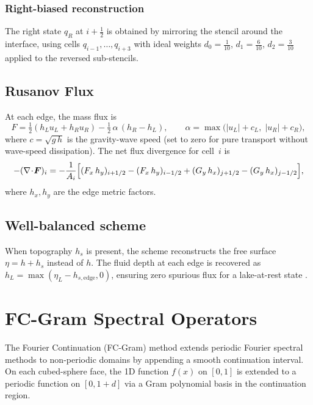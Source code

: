 \documentclass[11pt,a4paper]{article}
\newcommand{\half}{\tfrac{1}{2}}
\begin{document}
\subsubsection{Right-biased reconstruction}
The right state $q_R$ at $i\!+\!\half$ is obtained by mirroring the stencil around the interface, using cells $q_{i-1},\ldots,q_{i+3}$ with ideal weights $d_0=\tfrac{1}{10}$, $d_1=\tfrac{6}{10}$, $d_2=\tfrac{3}{10}$ applied to the reversed sub-stencils.

\subsection{Rusanov Flux}

At each edge, the mass flux is
\begin{equation}
  F = \half(h_L u_L + h_R u_R) - \half\,\alpha\,(h_R-h_L),
  \qquad \alpha=\max\!\bigl(|u_L|+c_L,\;|u_R|+c_R\bigr),
\end{equation}
where $c=\sqrt{g\,h}$ is the gravity-wave speed (set to zero for pure transport without wave-speed dissipation).  The net flux divergence for cell~$i$ is
\begin{equation}
  -(\nabla\!\cdot\!\bm F)_i = -\frac{1}{A_i}\Bigl[(F_x\,h_y)_{i+1/2}-(F_x\,h_y)_{i-1/2}+(G_y\,h_x)_{j+1/2}-(G_y\,h_x)_{j-1/2}\Bigr],
\end{equation}
where $h_x,h_y$ are the edge metric factors.

\subsection{Well-balanced scheme}
When topography $h_s$ is present, the scheme reconstructs the free surface $\eta=h+h_s$ instead of $h$.  The fluid depth at each edge is recovered as $h_L=\max(\eta_L-h_{s,\mathrm{edge}},0)$, ensuring zero spurious flux for a lake-at-rest state \citep{Audusse2004}.

\section{FC-Gram Spectral Operators}

The Fourier Continuation (FC-Gram) method extends periodic Fourier spectral methods to non-periodic domains by appending a smooth continuation interval.  On each cubed-sphere face, the 1D function $f(x)$ on $[0,1]$ is extended to a periodic function on $[0,1+d]$ via a Gram polynomial basis in the continuation region.
\end{document}
